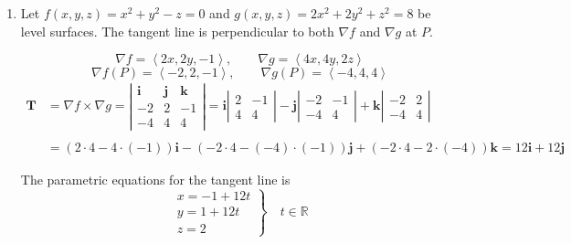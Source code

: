 \documentclass[a4paper, 12pt]{article}
\begin{document}
\begin{enumerate}[leftmargin=*,label=\textbf{\arabic*.}]
The result is then

\[\left.\frac{dz}{dt}\right|_{t=0}=-\cos0=\boxed{-1}\]

\item Let $f(x,y,z)=x^2+y^2-z=0$ and $g(x,y,z)=2x^2+2y^2+z^2=8$ be level surfaces. The tangent line is perpendicular to both $\nabla f$ and $\nabla g$ at $P$.

\[\nabla f=\left\langle2x,2y,-1\right\rangle,\qquad\nabla g=\left\langle4x,4y,2z\right\rangle\]
\[\nabla f(P)=\left\langle-2,2,-1\right\rangle,\qquad\nabla g(P)=\left\langle-4,4,4\right\rangle\]
\begin{align*}\mathbf{T}&=\nabla f\times\nabla g=\left|\begin{array}{ccc}
\mathbf{i}&\mathbf{j}&\mathbf{k}\\
-2&2&-1\\
-4&4&4
\end{array}\right|=\mathbf{i}\left|\begin{array}{cc}
2&-1\\4&4
\end{array}\right|-\mathbf{j}\left|\begin{array}{cc}
-2&-1\\-4&4
\end{array}\right|+\mathbf{k}\left|\begin{array}{cc}
-2&2\\-4&4
\end{array}\right|\\\\&=(2\cdot4-4\cdot(-1))\mathbf{i}-(-2\cdot4-(-4)\cdot(-1))\mathbf{j}+(-2\cdot4-2\cdot(-4))\mathbf{k}=12\mathbf i+12\mathbf j\end{align*}

The parametric equations for the tangent line is
\[\boxed{\left.\begin{array}{l}
x=-1+12t\\
y=1+12t\\
z=2
\end{array}\right\}\quad t\in\mathbb{R}}\]

\end{enumerate}
\end{document}
